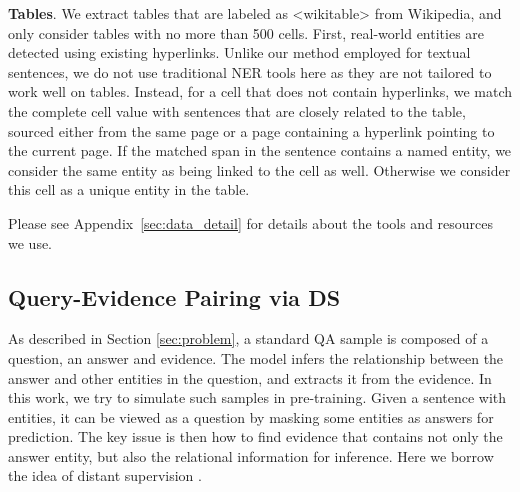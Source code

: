 \documentclass[11pt]{article}
\newcommand{\add}[1]{\textcolor{red}{#1}}
\newcommand{\revise}[1]{#1}
\newcommand{\nop}[1]{}
\begin{document}
\noindent\textbf{\revise{Tables}}. We extract tables that are labeled as <wikitable> from Wikipedia, and only consider tables with no more than 500 cells. First,  real-world entities are detected using existing hyperlinks. Unlike our method employed for textual sentences, we do not use traditional NER tools here as they are not tailored to work well on tables. Instead, for a cell that does not contain hyperlinks, we match the complete cell value with sentences that are closely related to the table, sourced either from the same page or a page containing a hyperlink pointing to the current page.\nop{I wonder if there is a more clear way to rephrase the following sentence. how to get the matched span in the sentence?} If the matched span in the sentence contains a named entity, we consider the same entity as being linked to the cell as well. Otherwise we consider this cell as a unique entity in the table.\nop{Concrete examples may be needed (can be put in Appendix) to explain this process well.}

Please see Appendix~\ref{sec:data_detail} for details about the tools and resources we use.

\nop{perhaps reordered the writing a bit here.  First say we use existing hyperlinks to aim for high-precision entity linking.  Next, say we don't use traditional NER tools as they are not tailored towards tables, therefore cannot provide the level of precision we're comfortable with.  Then describe what we're doing in addition to hyperlinks to increase table entity recall while keeping the high precision.}

\subsection{Query-Evidence Pairing via DS}
{As described in Section \ref{sec:problem}, a standard QA sample is composed of a question, an answer and evidence. The model infers the relationship between the answer and other entities in the question, and extracts it from the evidence.} In this work, we try to simulate such samples in pre-training. Given a sentence with entities, it can be viewed as a question by masking some entities as answers for prediction. The key issue is then how to find evidence that {contains not only the answer entity, but also the relational information for inference.} Here we borrow the idea of distant supervision \cite{mintz-etal-2009-distant}.\nop{The original distant supervision assumption is that \add{``any sentence that contains a pair of entities that participate in a known knowledge base relation is likely to express that relation in some way''.} We remove the KB relation constraint in the original assumption and generalize it as ``any sentence that contains a pair of related entities is likely to express the relations between the entities in some way''. Given a masked ``question'' sentence, we use other sentences (or tables) that contain the masked ``answer'' entity and another entity in the ``question'' as evidence.}  \nop{c.f.\ the intro of this paper https://arxiv.org/pdf/1704.05958.pdf for the proper way to introduce distant supervision}
\end{document}
